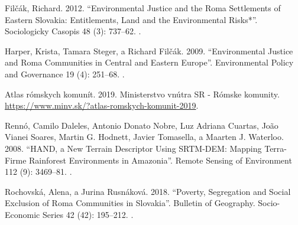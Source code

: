 {Filčák, Richard. 2012. “Environmental Justice and the Roma Settlements of Eastern Slovakia: Entitlements, Land and the Environmental Risks*”. Sociologicky Casopis 48 (3): 737–62. .

Harper, Krista, Tamara Steger, a Richard Filčák. 2009. “Environmental Justice and Roma Communities in Central and Eastern Europe”. Environmental Policy and Governance 19 (4): 251–68. .
	
Atlas rómskych komunít. 2019. Ministerstvo vnútra SR - Rómske komunity. \url{https://www.minv.sk/?atlas-romskych-komunit-2019}.

Rennó, Camilo Daleles, Antonio Donato Nobre, Luz Adriana Cuartas, João Vianei Soares, Martin G. Hodnett, Javier Tomasella, a Maarten J. Waterloo. 2008. “HAND, a New Terrain Descriptor Using SRTM-DEM: Mapping Terra-Firme Rainforest Environments in Amazonia”. Remote Sensing of Environment 112 (9): 3469–81. .

Rochovská, Alena, a Jurina Rusnáková. 2018. “Poverty, Segregation and Social Exclusion of Roma Communities in Slovakia”. Bulletin of Geography. Socio-Economic Series 42 (42): 195–212. .
}%

